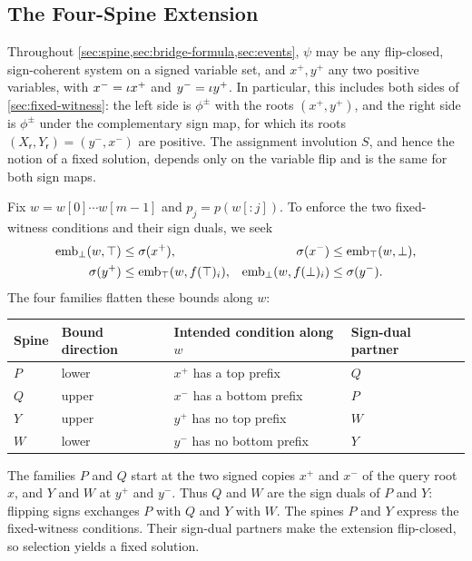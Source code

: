 

\subsection{The Four-Spine Extension}\label{sec:spine}
Throughout \cref{sec:spine,sec:bridge-formula,sec:events}, $\psi$ may be any
flip-closed, sign-coherent system on a signed variable set, and $x^+,y^+$
any two positive variables, with $x^-=\iota x^+$ and $y^-=\iota y^+$.
In particular, this includes both sides of \cref{sec:fixed-witness}: the
left side is $\phi^{\pm}$ with the roots $(x^+,y^+)$, and the right side is
$\phi^{\pm}$ under the complementary sign map, for which its roots
$(X_{\mathsf r},Y_{\mathsf r})=(y^-,x^-)$ are positive. The assignment
involution $S$, and hence the notion of a fixed solution, depends only on
the variable flip and is the same for both sign maps.

Fix $w=w[0]\cdots w[m-1]$ and $p_j=p(w[:j])$.
To enforce the two fixed-witness conditions and their sign duals, we seek
\begin{equation}\label{eq:g29}
\begin{aligned}
 \operatorname{emb}_\bot(w,\top)&\le\sigma(x^+),&
 \sigma(x^-)&\le\operatorname{emb}_\top(w,\bot),\\
 \sigma(y^+)&\le\operatorname{emb}_\top(w,f(\top)_i),&
 \operatorname{emb}_\bot(w,f(\bot)_i)&\le\sigma(y^-).
\end{aligned}
\end{equation}
The four families flatten these bounds along $w$:
\begin{center}
\small
\begin{tabular}{@{}llll@{}}
\toprule
Spine & Bound direction & Intended condition along $w$ & Sign-dual partner\\
\midrule
$P$ & lower & $x^+$ has a top prefix & $Q$\\
$Q$ & upper & $x^-$ has a bottom prefix & $P$\\
$Y$ & upper & $y^+$ has no top prefix & $W$\\
$W$ & lower & $y^-$ has no bottom prefix & $Y$\\
\bottomrule
\end{tabular}
\end{center}
The families $P$ and $Q$ start at the two signed copies $x^+$ and $x^-$
of the query root $x$, and $Y$ and $W$ at $y^+$ and $y^-$. Thus $Q$ and
$W$ are the sign duals of $P$ and $Y$: flipping signs exchanges $P$ with
$Q$ and $Y$ with $W$.
The spines $P$ and $Y$ express the fixed-witness conditions. Their
sign-dual partners make the extension flip-closed, so selection yields a
fixed solution.


